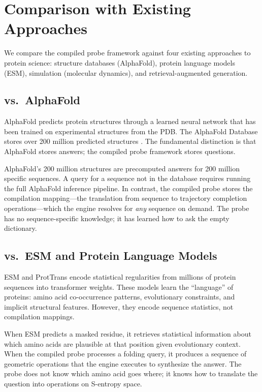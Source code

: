 \documentclass[11pt,twocolumn,a4paper]{article}
\theoremstyle{definition}
\theoremstyle{remark}
\begin{document}
\section{Comparison with Existing Approaches}
\label{sec:comparison}

We compare the compiled probe framework against four existing approaches to protein science: structure databases (AlphaFold), protein language models (ESM), simulation (molecular dynamics), and retrieval-augmented generation.

\subsection{vs.\ AlphaFold}

AlphaFold \citep{jumper2021} predicts protein structures through a learned neural network that has been trained on experimental structures from the PDB. The AlphaFold Database stores over 200 million predicted structures \citep{berman2000}. The fundamental distinction is that AlphaFold stores answers; the compiled probe framework stores questions.

AlphaFold's 200 million structures are precomputed answers for 200 million specific sequences. A query for a sequence not in the database requires running the full AlphaFold inference pipeline. In contrast, the compiled probe stores the compilation mapping---the translation from sequence to trajectory completion operations---which the engine resolves for \emph{any} sequence on demand. The probe has no sequence-specific knowledge; it has learned how to ask the empty dictionary.

\subsection{vs.\ ESM and Protein Language Models}

ESM \citep{lin2023, rives2021} and ProtTrans \citep{elnaggar2021} encode statistical regularities from millions of protein sequences into transformer weights. These models learn the ``language'' of proteins: amino acid co-occurrence patterns, evolutionary constraints, and implicit structural features. However, they encode sequence statistics, not compilation mappings.

When ESM predicts a masked residue, it retrieves statistical information about which amino acids are plausible at that position given evolutionary context. When the compiled probe processes a folding query, it produces a sequence of geometric operations that the engine executes to synthesize the answer. The probe does not know which amino acid goes where; it knows how to translate the question into operations on S-entropy space.
\end{document}
